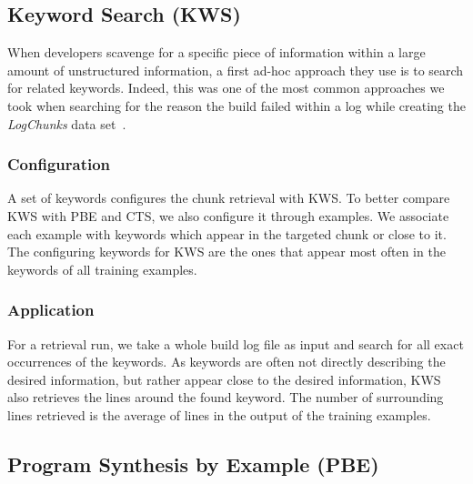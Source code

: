 \subsection{Keyword Search (KWS)}
\label{sec:expl-skws}
When developers scavenge for a specific piece of information within a large amount of unstructured information, a first ad-hoc approach they use is to search for related keywords.
Indeed, this was one of the most common approaches we took when searching for the reason the build failed within a log while creating the \emph{LogChunks} data set~\cite{logchunks}.

\subsubsection{Configuration}
A set of keywords configures the chunk retrieval with KWS\@.
To better compare KWS with PBE and CTS, we also configure it through examples.
We associate each example with keywords which appear in the targeted chunk or close to it.
The configuring keywords for KWS are the ones that appear most often in the keywords of all training examples.

\subsubsection{Application}
For a retrieval run, we take a whole build log file as input and search for all exact occurrences of the keywords.
As keywords are often not directly describing the desired information, but rather appear close to the desired information, KWS also retrieves the lines around the found keyword.
The number of surrounding lines retrieved is the average of lines in the output of the training examples.


\subsection{Program Synthesis by Example (PBE)}
\label{sec:expl-pbe}

